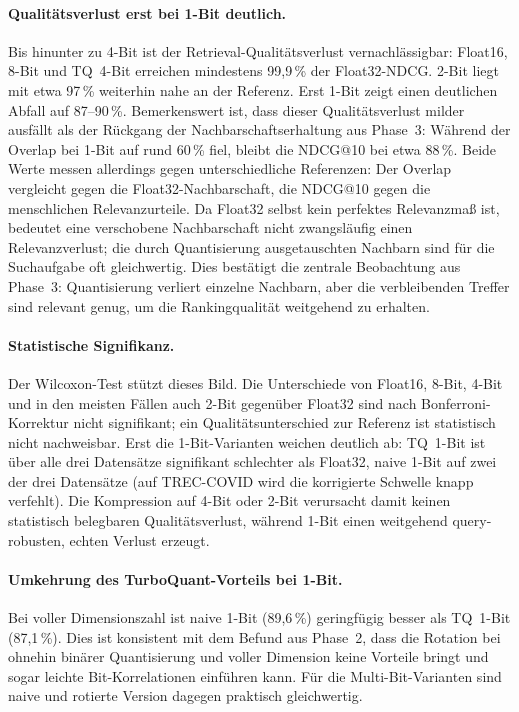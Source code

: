 \paragraph{Qualitätsverlust erst bei 1-Bit deutlich.}
Bis hinunter zu 4-Bit ist der Retrieval-Qualitätsverlust vernachlässigbar: Float16, 8-Bit und TQ~4-Bit erreichen mindestens 99{,}9\,\% der Float32-NDCG.
2-Bit liegt mit etwa 97\,\% weiterhin nahe an der Referenz.
Erst 1-Bit zeigt einen deutlichen Abfall auf 87--90\,\%.
Bemerkenswert ist, dass dieser Qualitätsverlust milder ausfällt als der Rückgang der Nachbarschaftserhaltung aus Phase~3: Während der Overlap bei 1-Bit auf rund 60\,\% fiel, bleibt die NDCG@10 bei etwa 88\,\%.
Beide Werte messen allerdings gegen unterschiedliche Referenzen: Der Overlap vergleicht gegen die Float32-Nachbarschaft, die NDCG@10 gegen die menschlichen Relevanzurteile.
Da Float32 selbst kein perfektes Relevanzmaß ist, bedeutet eine verschobene Nachbarschaft nicht zwangsläufig einen Relevanzverlust; die durch Quantisierung ausgetauschten Nachbarn sind für die Suchaufgabe oft gleichwertig.
Dies bestätigt die zentrale Beobachtung aus Phase~3: Quantisierung verliert einzelne Nachbarn, aber die verbleibenden Treffer sind relevant genug, um die Rankingqualität weitgehend zu erhalten.
%
\paragraph{Statistische Signifikanz.}
Der Wilcoxon-Test stützt dieses Bild.
Die Unterschiede von Float16, 8-Bit, 4-Bit und in den meisten Fällen auch 2-Bit gegenüber Float32 sind nach Bonferroni-Korrektur nicht signifikant; ein Qualitätsunterschied zur Referenz ist statistisch nicht nachweisbar.
Erst die 1-Bit-Varianten weichen deutlich ab: TQ~1-Bit ist über alle drei Datensätze signifikant schlechter als Float32, naive 1-Bit auf zwei der drei Datensätze (auf TREC-COVID wird die korrigierte Schwelle knapp verfehlt).
Die Kompression auf 4-Bit oder 2-Bit verursacht damit keinen statistisch belegbaren Qualitätsverlust, während 1-Bit einen weitgehend query-robusten, echten Verlust erzeugt.
%
\paragraph{Umkehrung des TurboQuant-Vorteils bei 1-Bit.}
Bei voller Dimensionszahl ist naive 1-Bit (89{,}6\,\%) geringfügig besser als TQ~1-Bit (87{,}1\,\%).
Dies ist konsistent mit dem Befund aus Phase~2, dass die Rotation bei ohnehin binärer Quantisierung und voller Dimension keine Vorteile bringt und sogar leichte Bit-Korrelationen einführen kann.
Für die Multi-Bit-Varianten sind naive und rotierte Version dagegen praktisch gleichwertig.
%
